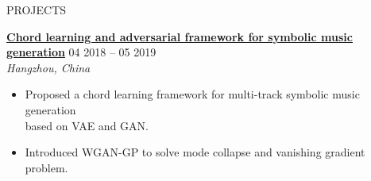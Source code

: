 \documentclass{resume}
\begin{document}
\vspace{-1em}
\begin{rSection}{PROJECTS}
\vspace{-1.25em}
    \item \textbf{\href{https://docs.google.com/presentation/d/1797idRRmgeD2JnUslGbflmGUO2X5lMY6/edit?usp=drive_link&ouid=101248488395326982475&rtpof=true&sd=true}{\textbf{\large{\underline{Chord learning and adversarial framework for symbolic music generation}}}}} \hfill {04 2018 -- 05 2019}\\
    \mbox{} \hfill \textit{Hangzhou, China}
    \begin{itemize}
        \item Proposed a chord learning framework for multi-track symbolic music generation\\based on VAE and GAN.
        \item Introduced WGAN-GP to solve mode collapse and vanishing gradient problem.
    \end{itemize}

    

\end{rSection}
\end{document}
